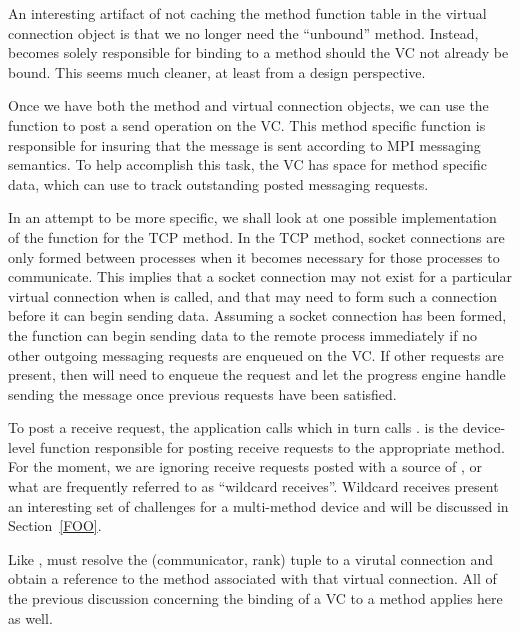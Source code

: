 \begin{cmt}
  An interesting artifact of not caching the method function table in the
  virtual connection object is that we no longer need the ``unbound'' method.
  Instead,  becomes solely responsible for binding to
  a method should the VC not already be bound.  This seems much cleaner, at
  least from a design perspective.
\end{cmt}

Once we have both the method and virtual connection objects, we can use the
 function to post a send operation on the VC.  This
method specific function is responsible for insuring that the message is sent
according to MPI messaging semantics.  To help accomplish this task, the VC has
space for method specific data, which  can use to track
outstanding posted messaging requests.

In an attempt to be more specific, we shall look at one possible
implementation of the  function for the TCP method.  In the TCP
method, socket connections are only formed between processes when it becomes
necessary for those processes to communicate.  This implies that a socket
connection may not exist for a particular virtual connection when
 is called, and that  may need to form such a
connection before it can begin sending data.  Assuming a socket connection has
been formed, the  function can begin sending data to the remote
process immediately if no other outgoing messaging requests are enqueued on the
VC.  If other requests are present, then  will need to enqueue
the request and let the progress engine handle sending the message once
previous requests have been satisfied.

To post a receive request, the application calls  which in
turn calls .   is the device-level
function responsible for posting receive requests to the appropriate method.
For the moment, we are ignoring receive requests posted with a source of
, or what are frequently referred to as ``wildcard
receives''.  Wildcard receives present an interesting set of challenges for a
multi-method device and will be discussed in Section~\ref{FOO}.

Like ,  must resolve the (communicator, rank)
tuple to a virutal connection and obtain a reference to the method associated
with that virtual connection.  All of the previous discussion concerning the
binding of a VC to a method applies here as well.

